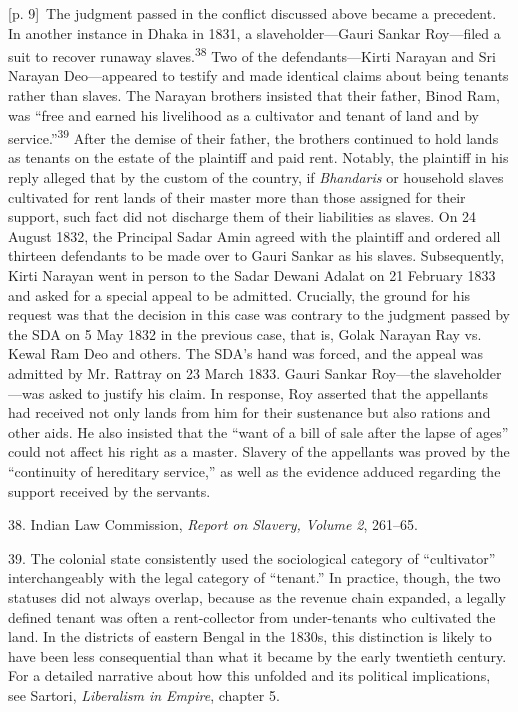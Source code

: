 \documentclass[10pt,a4paper]{article}
\begin{document}
{\scriptsize\color{gray} [p. 9]}\ The judgment passed in the conflict discussed above became a precedent. In another instance in Dhaka in 1831, a slaveholder—Gauri Sankar Roy—filed a suit to recover runaway slaves.\nobreak\textsuperscript{38} Two of the defendants—Kirti Narayan and Sri Narayan Deo—appeared to testify and made identical claims about being tenants rather than slaves. The Narayan brothers insisted that their father, Binod Ram, was “free and earned his livelihood as a cultivator and tenant of land and by service.”\nobreak\textsuperscript{39} After the demise of their father, the brothers continued to hold lands as tenants on the estate of the plaintiff and paid rent. Notably, the plaintiff in his reply alleged that by the custom of the country, if \textit{Bhandaris} or household slaves cultivated for rent lands of their master more than those assigned for their support, such fact did not discharge them of their liabilities as slaves. On 24 August 1832, the Principal Sadar Amin agreed with the plaintiff and ordered all thirteen defendants to be made over to Gauri Sankar as his slaves. Subsequently, Kirti Narayan went in person to the Sadar Dewani Adalat on 21 February 1833 and asked for a special appeal to be admitted. Crucially, the ground for his request was that the decision in this case was contrary to the judgment passed by the SDA on 5 May 1832 in the previous case, that is, Golak Narayan Ray vs. Kewal Ram Deo and others. The SDA’s hand was forced, and the appeal was admitted by Mr. Rattray on 23 March 1833. Gauri Sankar Roy—the slaveholder—was asked to justify his claim. In response, Roy asserted that the appellants had received not only lands from him for their sustenance but also rations and other aids. He also insisted that the “want of a bill of sale after the lapse of ages” could not affect his right as a master. Slavery of the appellants was proved by the “continuity of hereditary service,” as well as the evidence adduced regarding the support received by the servants.\par{\small 38. Indian Law Commission, \textit{Report on Slavery, Volume 2}, 261–65.\par}{\small 39. The colonial state consistently used the sociological category of “cultivator” interchangeably with the legal category of “tenant.” In practice, though, the two statuses did not always overlap, because as the revenue chain expanded, a legally defined tenant was often a rent-collector from under-tenants who cultivated the land. In the districts of eastern Bengal in the 1830s, this distinction is likely to have been less consequential than what it became by the early twentieth century. For a detailed narrative about how this unfolded and its political implications, see Sartori, \textit{Liberalism in Empire}, chapter 5.\par}
\end{document}

